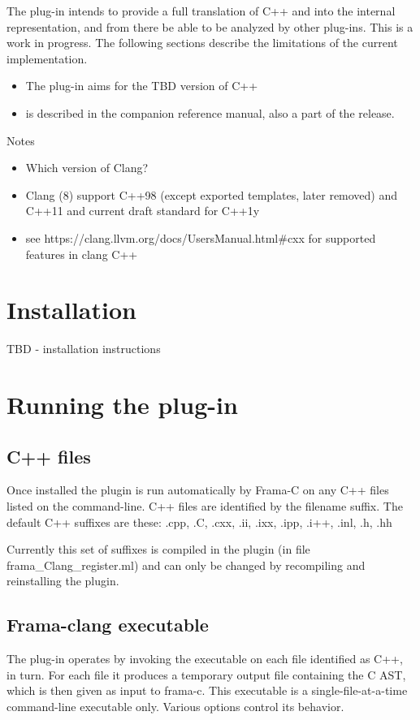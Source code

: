 The \fclang plug-in intends to provide a full translation of C++ and \acslpp into the \framac internal representation, and from there be able to be analyzed by other \framac plug-ins. This is a work in progress. The following sections describe the  limitations of the current implementation.
\begin{itemize}
	\item The plug-in aims for the TBD version of C++
	\item \acslpp is described in the companion \acslpp reference manual, also a part of the \framac release.
\end{itemize}


Notes
\begin{itemize}
	\item Which version of Clang?
	\item Clang (8) support C++98 (except exported templates, later removed) and C++11 and current draft standard for C++1y 
	\item see https://clang.llvm.org/docs/UsersManual.html\#cxx for supported features in clang C++
\end{itemize}

\chapter{Installation}

TBD - installation instructions

\chapter{Running the plug-in}

\section{C++ files}
Once installed the plugin is run automatically by Frama-C on any C++ files listed on the command-line. C++ files are identified by the filename suffix. The default C++ suffixes are these:
 .cpp, .C, .cxx, .ii, .ixx, .ipp, .i++, .inl, .h, .hh

Currently this set of suffixes is compiled in the plugin (in file frama\_Clang\_register.ml) and can only be changed by recompiling and
reinstalling the plugin.

\section{Frama-clang executable}
The plug-in operates by invoking the executable \irg
on each file identified as C++, in turn. 
For each file it produces a temporary output file containing the C AST, which is then given as input to frama-c. This executable is a single-file-at-a-time command-line executable only. 
Various options control its behavior.

